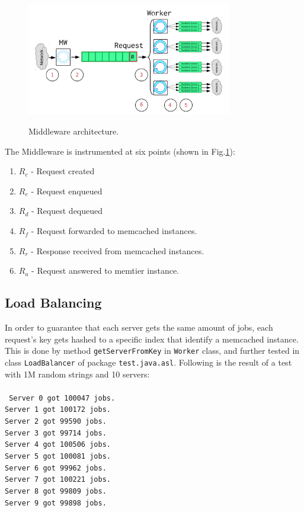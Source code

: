 \documentclass[11pt,a4paper]{article}
\begin{document}
\begin{figure}[h]
    \centering
    \includegraphics[width=0.8\textwidth]{figures/architecture.png}
    \label{fig:architecture}
    \caption{Middleware architecture.}
\end{figure}

The Middleware is instrumented at six points (shown in Fig.\ref{fig:architecture}):

\begin{enumerate}
    \item $R_{c}$ - Request created
    \item $R_{e}$ - Request enqueued
    \item $R_{d}$ - Request dequeued
    \item $R_{f}$ - Request forwarded to memcached instances.
    \item $R_{r}$ - Response received from memcached instances.
    \item $R_{a}$ - Request answered to memtier instance.
\end{enumerate}

\subsection{Load Balancing}

In order to guarantee that each server gets the same amount of jobs, each request's key gets hashed to a specific index that identify a memcached instance.\\This is done by method \texttt{getServerFromKey} in \texttt{Worker} class, and further tested in class \texttt{LoadBalancer} of package \texttt{test.java.asl}. Following is the result of a test with 1M random strings and 10 servers: \\\\
\texttt{
    Server 0 got 100047 jobs.\\
    Server 1 got 100172 jobs.\\
    Server 2 got 99590 jobs.\\
    Server 3 got 99714 jobs.\\
    Server 4 got 100506 jobs.\\
    Server 5 got 100081 jobs.\\
    Server 6 got 99962 jobs.\\
    Server 7 got 100221 jobs.\\
    Server 8 got 99809 jobs.\\
    Server 9 got 99898 jobs.\\}
\end{document}

